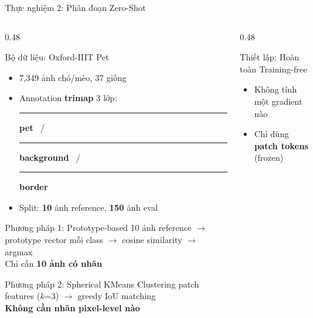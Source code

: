 \documentclass[aspectratio=169]{beamer}
\begin{document}
\begin{frame}[t,shrink=15]{Thực nghiệm 2: Phân đoạn Zero-Shot}
    \begin{columns}[t]
        \begin{column}{0.48\textwidth}
            \begin{block}{Bộ dữ liệu: Oxford-IIIT Pet}
                \begin{itemize}
                    \item 7,349 ảnh chó/mèo, 37 giống
                    \item Annotation \textbf{trimap} 3 lớp:\\
                          \textcolor{red}{\rule{8pt}{8pt}} \textbf{pet} \ / \ \textcolor{blue}{\rule{8pt}{8pt}} \textbf{background} \ / \ \textcolor{successgreen}{\rule{8pt}{8pt}} \textbf{border}
                    \item Split: \textbf{10} ảnh reference, \textbf{150} ảnh eval
                \end{itemize}
            \end{block}
            \vspace{0.15cm}
            \begin{block}{Phương pháp 1: Prototype-based}
                \small 10 ảnh reference $\to$ prototype vector mỗi class $\to$ cosine similarity $\to$ argmax\\
                Chỉ cần \textbf{10 ảnh có nhãn}
            \end{block}
            \vspace{0.1cm}
            \begin{block}{Phương pháp 2: Spherical KMeans}
                \small Clustering patch features ($k$=3) $\to$ greedy IoU matching\\
                \textbf{Không cần nhãn pixel-level nào}
            \end{block}
        \end{column}
        \begin{column}{0.48\textwidth}
            \begin{exampleblock}{Thiết lập: Hoàn toàn Training-free}
                \begin{itemize}
                    \item \alert{Không tính một gradient nào}
                    \item Chỉ dùng \textbf{patch tokens} (frozen)

\end{itemize}
\end{exampleblock}
\end{column}
\end{columns}
\end{frame}
\end{document}
